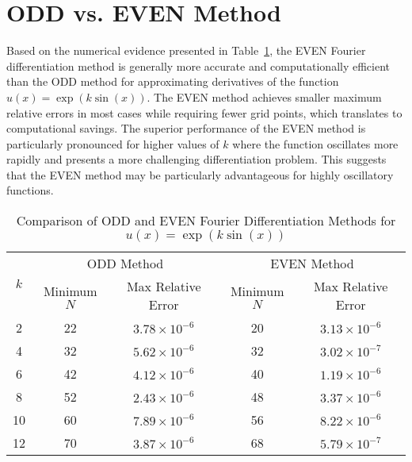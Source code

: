 \section{ODD vs. EVEN Method}

Based on the numerical evidence presented in Table~\ref{tab:fourier-comparison}, the EVEN Fourier differentiation method is generally more accurate and computationally efficient than the ODD method for approximating derivatives of the function $u(x) = \exp(k\sin(x))$. The EVEN method achieves smaller maximum relative errors in most cases while requiring fewer grid points, which translates to computational savings.
The superior performance of the EVEN method is particularly pronounced for higher values of $k$ where the function oscillates more rapidly and presents a more challenging differentiation problem. This suggests that the EVEN method may be particularly advantageous for highly oscillatory functions.
\begin{table}[H]
	\centering
	\begin{tabular}{|c|cc|cc|}
		\hline
		\multirow{2}{*}{$k$} & \multicolumn{2}{c|}{ODD Method} & \multicolumn{2}{c|}{EVEN Method}                                       \\
		\cline{2-5}
		                     & Minimum $N$                     & Max Relative Error               & Minimum $N$ & Max Relative Error    \\
		\hline
		2                    & 22                              & $3.78 \times 10^{-6}$            & 20          & $3.13 \times 10^{-6}$ \\
		4                    & 32                              & $5.62 \times 10^{-6}$            & 32          & $3.02 \times 10^{-7}$ \\
		6                    & 42                              & $4.12 \times 10^{-6}$            & 40          & $1.19 \times 10^{-6}$ \\
		8                    & 52                              & $2.43 \times 10^{-6}$            & 48          & $3.37 \times 10^{-6}$ \\
		10                   & 60                              & $7.89 \times 10^{-6}$            & 56          & $8.22 \times 10^{-6}$ \\
		12                   & 70                              & $3.87 \times 10^{-6}$            & 68          & $5.79 \times 10^{-7}$ \\
		\hline
	\end{tabular}
	\caption{Comparison of ODD and EVEN Fourier Differentiation Methods for $u(x) = \exp(k\sin(x))$}
	\label{tab:fourier-comparison}
\end{table}
